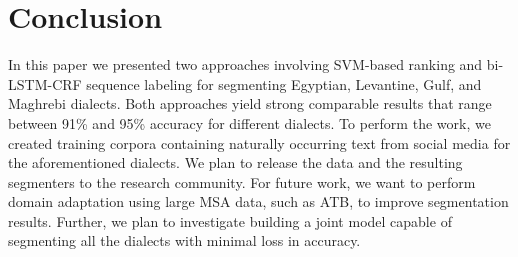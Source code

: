 \documentclass[11pt,letterpaper]{article}
\begin{document}
\section{Conclusion}
In this paper we presented two approaches involving SVM-based ranking and bi-LSTM-CRF sequence labeling for segmenting Egyptian, Levantine, Gulf, and Maghrebi dialects. Both approaches yield strong comparable results that range between 91\% and 95\% accuracy for different dialects. To perform the work, we created training corpora containing naturally occurring text from social media for the aforementioned dialects.  We plan to release the data and the resulting segmenters to the research community. For future work, we want to perform domain adaptation using large MSA data, such as ATB, to improve segmentation results.  Further, we plan to investigate building a joint model capable of segmenting all the dialects with minimal loss in accuracy.




\end{document}
